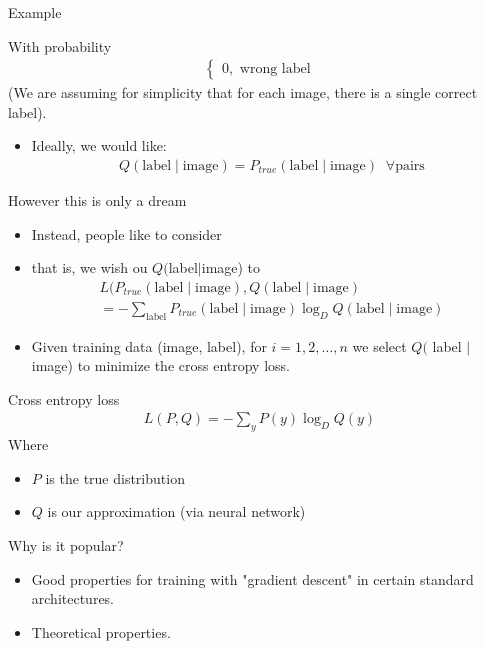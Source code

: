 \begin{parag}{Example}
\begin{subparag}{With probability}
\begin{align*}
\begin{cases}
            0, \text{ wrong label}
        \end{cases}
    \end{align*}
    (We are assuming for simplicity that for each image, there is a single correct label).\\
    \begin{itemize}
        \item Ideally, we would like:
            \begin{align*}
                Q( \text{label} \mid \text{image}) = P_{true}( \text{label} \mid \text{image}) \; \; \forall \text{pairs}
            \end{align*}
    \end{itemize}
   However this is only a dream
   \begin{itemize}
       \item Instead, people like to consider 
       \item that is, we wish ou $Q($label$ \mid $image) to 
           \begin{align*}
               L(P_{true}( \text{label} \mid \text{image}), Q( \text{label} \mid \text{image}) \\
               = - \sum_{ \text{label}}P_{true}( \text{label} \mid  \text{image})\log_D Q( \text{label} \mid \text{image})
           \end{align*}
       \item Given training data (image, label), for $i = 1, 2, \dots, n$ we select $Q($ label $ \mid $ image) to minimize the cross entropy loss.
   \end{itemize}
    
\end{subparag}
\end{parag}
\begin{parag}{Cross entropy loss}
    \begin{align*}
        L(P, Q) = -\sum_y P(y)\log_DQ(y)
    \end{align*}
    Where
    \begin{itemize}
        \item $P$ is the true distribution
        \item $Q$ is our approximation (via neural network)
    \end{itemize}
    Why is it popular?
    \begin{itemize}
        \item Good properties for training with "gradient descent" in certain standard architectures.
        \item Theoretical properties.
    \end{itemize}
\end{parag}

